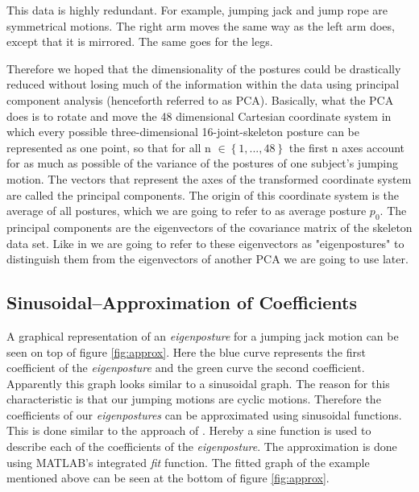 \documentclass[a4paper]{article}
\begin{document}
This data is highly redundant.
For example, jumping jack and jump rope are symmetrical motions.
The right arm moves the same way as the left arm does, except that it is mirrored.
The same goes for the legs.

Therefore we hoped that the dimensionality of the postures could be drastically reduced without losing much of the information within the data using principal component analysis (henceforth referred to as PCA).
Basically, what the PCA does is to rotate and move the 48 dimensional Cartesian coordinate system in which every possible three-dimensional 16-joint-skeleton posture can be represented as one point, so that for all n $\in \left\{1, ..., 48\right\}$ the first n axes account for as much as possible of the variance of the postures of one subject's jumping motion.
The vectors that represent the axes of the transformed coordinate system are called the principal components.
The origin of this coordinate system is the average of all postures, which we are going to refer to as average posture $p_{0}$.
The principal components are the eigenvectors of the covariance matrix of the skeleton data set.
Like in \cite{origin} we are going to refer to these eigenvectors as "eigenpostures" to distinguish them from the eigenvectors of another PCA we are going to use later.

\subsection{Sinusoidal--Approximation of Coefficients}
A graphical representation of an \emph{eigenposture} for a jumping jack motion can be seen on top of figure \ref{fig:approx}.
Here the blue curve represents the first coefficient of the \emph{eigenposture} and the green curve the second coefficient.
Apparently this graph looks similar to a sinusoidal graph.
The reason for this characteristic is that our jumping motions are cyclic motions.
Therefore the coefficients of our \emph{eigenpostures} can be approximated using sinusoidal functions.
This is done similar to the approach of \cite{origin}.
Hereby a sine function is used to describe each of the coefficients of the \emph{eigenposture}.
The approximation is done using MATLAB's integrated \emph{fit} function.
The fitted graph of the example mentioned above can be seen at the bottom of figure \ref{fig:approx}.
\end{document}
